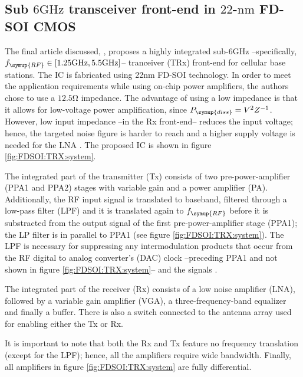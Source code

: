 \subsection{Sub $6\unit{\giga\hertz}$ transceiver front-end in $22$-$\unit{\nano\meter}$ FD-SOI CMOS}

	The final article discussed, \cite{FDSOI2}, proposes a highly integrated sub-$6\unit{\giga\hertz}$ --specifically, $f_{\symup{RF}}\in \left[ 1.25\unit{\giga\hertz}, 5.5\unit{\giga\hertz} \right]$-- tranceiver (TRx) front-end for cellular base stations. The IC is fabricated using 22nm FD-SOI technology. In order to meet the application requirements while using on-chip power amplifiers, the authors chose to use a $12.5\unit{\ohm}$ impedance. The advantage of using a low impedance is that it allows for low-voltage power amplification, since $P_{\symup{diss}}={V^2}{Z^{-1}}$. However, low input impedance --in the Rx front-end-- reduces the input voltage; hence, the targeted noise figure is harder to reach and a higher supply voltage is needed for the LNA \cite{FDSOI2}. The proposed IC is shown in figure \ref{fig:FDSOI:TRX:system}.\par

	The integrated part of the transmitter (Tx) consists of two pre-power-amplifier (PPA1 and PPA2) stages with variable gain and a power amplifier (PA). Additionally, the RF input signal is translated to baseband, filtered through a low-pass filter (LPF) and it is translated again to $f_{\symup{RF}}$ before it is substracted from the output signal of the first pre-power-amplifier stage (PPA1); the LP filter is in parallel to PPA1 (see figure \ref{fig:FDSOI:TRX:system}). The LPF is necessary for suppressing any intermodulation products that occur from the RF digital to analog converter's (DAC) clock --preceding PPA1 and not shown in figure \ref{fig:FDSOI:TRX:system}-- and the signals \cite{FDSOI2}.

	The integrated part of the receiver (Rx) consists of a low noise amplifier (LNA), followed by a variable gain amplifier (VGA), a three-frequency-band equalizer and finally a buffer. There is also a switch connected to the antenna array used for enabling either the Tx or Rx.\par

	It is important to note that both the Rx and Tx feature no frequency translation (except for the LPF); hence, all the amplifiers require wide bandwidth. Finally, all amplifiers in figure \ref{fig:FDSOI:TRX:system} are fully differential.\par

